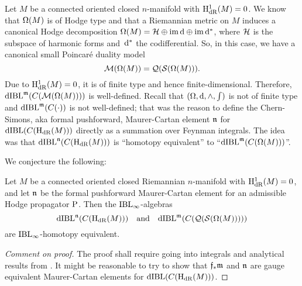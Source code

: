 \documentclass[\MainFolder/Text.tex]{subfiles}
\begin{document}

Let $M$ be a connected oriented closed $n$-manifold with $\mathrm{H}_{\mathrm{dR}}^1(M)=0$. We know that $\Omega(M)$ is of Hodge type and that a Riemannian metric on $M$ induces a canonical Hodge decomposition $\Omega(M) = \mathcal{H} \oplus \operatorname{im}\mathrm{d} \oplus \operatorname{im}\mathrm{d}^*$, where $\mathcal{H}$ is the subspace of harmonic forms and~$\mathrm{d}^*$ the codifferential. So, in this case, we have a canonical small Poincar\'e duality model 
$$ \mathcal{M}(\Omega(M)) = \mathcal{Q}(\mathcal{S}(\Omega(M))). $$
Due to $\mathrm{H}_{\mathrm{dR}}^1(M)=0$, it is of finite type and hence finite-dimensional. Therefore, $\mathrm{dIBL}^{\mathfrak{m}}(C(\mathcal{M}(\Omega(M))))$ is well-defined. Recall that $(\Omega,\mathrm{d},\wedge,\int)$ is not of finite type and $\mathrm{dIBL}^{\mathfrak{m}}(C(\cdot))$ is not well-defined;
that was the reason to define the Chern-Simons, aka formal pushforward, Maurer-Cartan element $\mathfrak{n}$ for $\mathrm{dIBL}(C(\mathrm{H}_{\mathrm{dR}}(M)))$ directly as a summation over Feynman integrals. The idea was that $\mathrm{dIBL}^{\mathfrak{n}}(C(\mathrm{H}_{\mathrm{dR}}(M)))$ is ``homotopy equivalent'' to ``$\mathrm{dIBL}^{\mathfrak{m}}(C(\Omega(M)))$''.

We conjecture the following:

\begin{Conjecture}\label{Conj:SmallSimplCon}
Let $M$ be a connected oriented closed Riemannian $n$-manifold with $\mathrm{H}_{\mathrm{dR}}^1(M) = 0$, and let $\mathfrak{n}$ be the formal pushforward Maurer-Cartan element for an admissible Hodge propagator $\mathrm{P}$. Then the $\mathrm{IBL}_\infty$-algebras 
$$\mathrm{dIBL}^{\mathfrak{n}}(C(\mathrm{H}_{\mathrm{dR}}(M)))\quad\text{and}\quad\mathrm{dIBL}^{\mathfrak{m}}(C(\mathcal{Q}(\mathcal{S}(\Omega(M))))) $$
are $\mathrm{IBL}_\infty$-homotopy equivalent.
\end{Conjecture}
\begin{proof}[Comment on proof]
The proof shall require going into integrals and analytical results from \cite{Cieliebak2018}. It might be reasonable to try to show that $\mathfrak{f}_* \mathfrak{m}$ and $\mathfrak{n}$ are gauge equivalent Maurer-Cartan elements for $\mathrm{dIBL}(C(\mathrm{H}_{\mathrm{dR}}(M)))$.
\end{proof}
\end{document}
